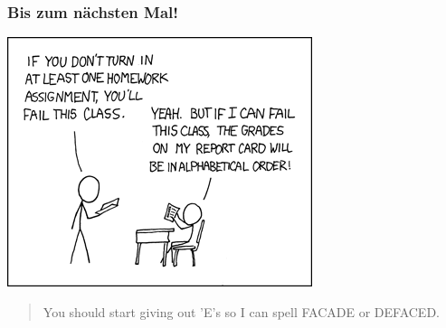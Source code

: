 \begin{frame}
 \frametitle{Bis zum nächsten Mal!}
 \begin{center} \includegraphics[scale=0.5]{images/xkcd_336.png} \end{center}
 \begin{quote}\scriptsize{You should start giving out 'E's so I can spell FACADE or DEFACED.}\end{quote}
\end{frame}


